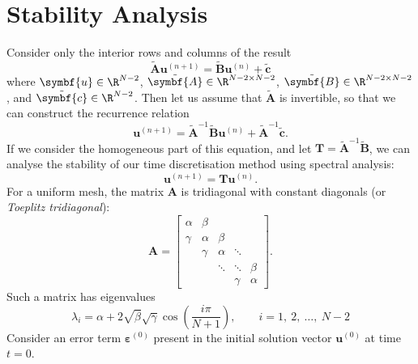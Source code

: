 \documentclass{article}
\begin{document}
\section{Stability Analysis}
Consider only the interior rows and columns of the result
\begin{equation*}
    \tilde{\symbf{A}} \symbf{u}^{\left( n+1 \right)} = \tilde{\symbf{B}} \symbf{u}^{\left( n \right)} + \tilde{\symbf{c}}
\end{equation*}
where \(\symbf{u} \in \R^{N - 2}\), \(\tilde{\symbf{A}} \in \R^{N - 2 \times N - 2}\),
\(\tilde{\symbf{B}} \in \R^{N - 2 \times N - 2}\), and \(\tilde{\symbf{c}} \in \R^{N - 2}\).
Then let us assume that \(\tilde{\symbf{A}}\) is invertible, so that we
can construct the recurrence relation
\begin{equation*}
    \symbf{u}^{\left( n+1 \right)} = \tilde{\symbf{A}}^{-1} \tilde{\symbf{B}} \symbf{u}^{\left( n \right)} + \tilde{\symbf{A}}^{-1} \tilde{\symbf{c}}.
\end{equation*}
If we consider the homogeneous part of this equation, and let
\(\symbf{T} = \tilde{\symbf{A}}^{-1} \tilde{\symbf{B}}\), we can
analyse the stability of our time discretisation method using
spectral analysis:
\begin{equation*}
    \symbf{u}^{\left( n+1 \right)} = \symbf{T} \symbf{u}^{\left( n \right)}.
\end{equation*}
For a uniform mesh, the matrix \(\symbf{A}\) is tridiagonal with constant
diagonals (or \textit{Toeplitz tridiagonal}):
\begin{equation*}
    \symbf{A} =
    \begin{bmatrix}
        \alpha & \beta  &        &        &        \\
        \gamma & \alpha & \beta  &        &        \\
               & \gamma & \alpha & \ddots &        \\
               &        & \ddots & \ddots & \beta  \\
               &        &        & \gamma & \alpha
    \end{bmatrix}
    .
\end{equation*}
Such a matrix has eigenvalues
\begin{equation*}
    \lambda_i = \alpha + 2 \sqrt{\beta} \sqrt{\gamma} \cos\left( \frac{i \pi}{N+1} \right), \qquad i = 1,\: 2,\: \ldots,\: N-2
\end{equation*}
Consider an error term \(\symbf{\varepsilon}^{\left( 0 \right)}\) present in the
initial solution vector \(\symbf{u}^{\left( 0 \right)}\) at time \(t = 0\).
\end{document}
